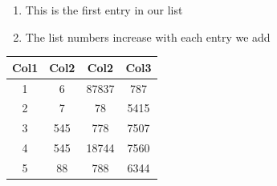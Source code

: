 \documentclass[sigconf,review, anonymous]{acmart}
\begin{document}
\begin{enumerate}
  \item This is the first entry in our list
  \item The list numbers increase with each entry we add
\end{enumerate}
\begin{center}
 \begin{tabular}{||c c c c||} 
 \hline
 Col1 & Col2 & Col2 & Col3 \\ [0.5ex] 
 \hline\hline
 1 & 6 & 87837 & 787 \\ 
 \hline
 2 & 7 & 78 & 5415 \\
 \hline
 3 & 545 & 778 & 7507 \\
 \hline
 4 & 545 & 18744 & 7560 \\
 \hline
 5 & 88 & 788 & 6344 \\ [1ex] 
 \hline
\end{tabular}
\end{center}
\end{document}
